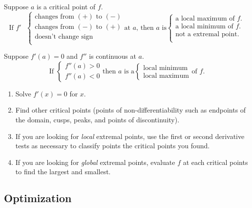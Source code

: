 \begin{thm}
Suppose $a$ is a critical point of $f$.
$$\text{If $f'$ } \begin{cases}
\text{changes from $(+)$ to $(-)$}\\
\text{changes from $(-)$ to $(+)$}\\
\text{doesn't change sign}\\
\end{cases}
\text{at $a$, then $a$ is}
\begin{cases}
\text{a local maximum of $f$}.\\
\text{a local minimum of $f$}.\\
\text{not a extremal point}.\\
\end{cases}$$
\end{thm}


\begin{thm}
Suppose $f'(a)=0$ and $f''$ is continuous at $a$.
$$\text{If } \begin{cases}
f''(a)>0\\
f''(a)<0
\end{cases}
\text{then $a$ is a}
\begin{cases}
\text{local minimum}\\
\text{local maximum}
\end{cases} \text{of $f$}.$$
\end{thm}


\begin{strat}
\begin{enumerate}[leftmargin=1em]
\item Solve $f'(x)=0$ for $x$.
\item Find other critical points (points of non-differentiability such as endpoints of the domain, cusps, peaks, and points of discontinuity).
\item If you are looking for \textit{local} extremal points, use the first or second derivative tests as necessary to classify points the critical points you found.
\item If you are looking for \textit{global} extremal points, evaluate $f$ at each critical points to find the largest and smallest.
\end{enumerate}
\end{strat}


\subsection{Optimization}

